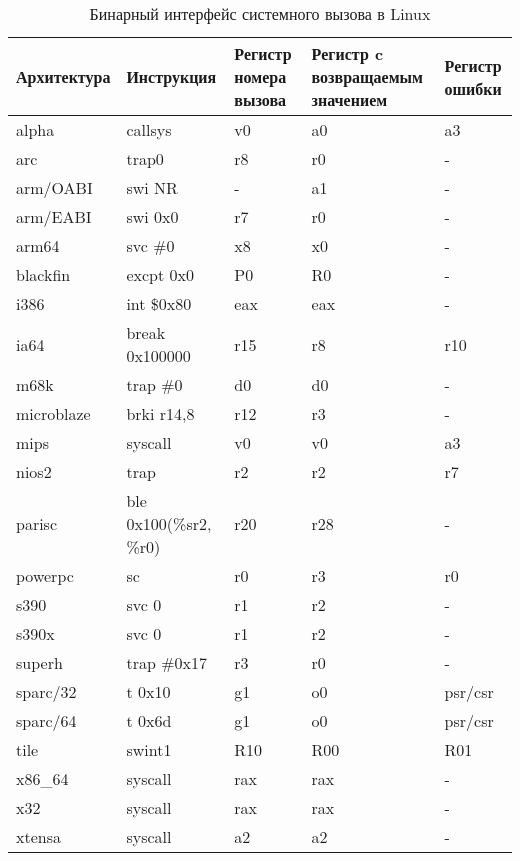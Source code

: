 \begin{table}
  \caption{Бинарный интерфейс системного вызова в Linux}
  \label{table:syscall_abi}
  \begin{tabular}{| >{\raggedright}m{}
                  | >{}m{}
                  | >{}m{}
                  | >{}m{}
                  | >{\arraybackslash}m{}|}
    \hline
    Архитектура & Инструкция & Регистр номера вызова & Регистр c возвращаемым значением & Регистр ошибки \\ \hline
    alpha & callsys & v0 & a0 & a3 \\ \hline
    arc & trap0 & r8 & r0 & - \\ \hline
    arm/OABI & swi NR & - & a1 & - \\ \hline
    arm/EABI & swi 0x0 & r7 & r0 & - \\ \hline
    arm64 & svc \#0 & x8 & x0 & - \\ \hline
    blackfin & excpt 0x0 & P0 & R0 & - \\ \hline
    i386 & int \$0x80 & eax & eax & - \\ \hline
    ia64 & break 0x100000 & r15 & r8 & r10 \\ \hline
    m68k & trap \#0 & d0 & d0 &  - \\ \hline
    microblaze & brki r14,8 & r12 & r3 & - \\ \hline
    mips & syscall & v0 & v0 & a3 \\ \hline
    nios2 & trap & r2 & r2 & r7 \\ \hline
    parisc & ble 0x100(\%sr2, \%r0) & r20 & r28 & - \\ \hline
    powerpc & sc & r0 & r3 & r0 \\ \hline
    s390 & svc 0 & r1 & r2 & - \\ \hline
    s390x & svc 0 & r1 & r2 & - \\ \hline
    superh & trap \#0x17 & r3 & r0 & - \\ \hline
    sparc/32 & t 0x10 & g1 & o0 & psr/csr \\ \hline
    sparc/64 & t 0x6d & g1 & o0 & psr/csr \\ \hline
    tile & swint1 & R10 & R00 & R01 \\ \hline
    x86\_64 & syscall & rax & rax & - \\ \hline
    x32 & syscall & rax & rax & - \\ \hline
    xtensa & syscall & a2 & a2 & - \\ \hline
  \end{tabular}
\end{table}

